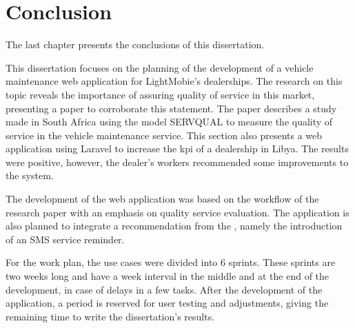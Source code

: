 \chapter{Conclusion}%
\label{chapter:conclusion}

\begin{introduction}
The last chapter presents the conclusions of this dissertation.
\end{introduction} 


This dissertation focuses on the planning of the development of a vehicle maintenance web application for LightMobie's dealerships. 
The research on this topic reveals the importance of assuring quality of service in this market, presenting a paper to corroborate this statement.
The paper describes a study made in South Africa using the model SERVQUAL to measure the quality of service in the vehicle maintenance service.
This section also presents a web application using Laravel to increase the \acs{kpi} of a dealership in Libya. 
The results were positive, however, the dealer's workers recommended some improvements to the system.

The development of the web application was based on the workflow of the research paper with an emphasis on quality service evaluation.
The application is also planned to integrate a recommendation from the \citet{MAS_MOTORS}, namely the introduction of an SMS service reminder. 

For the work plan, the use cases were divided into 6 sprints. 
These sprints are two weeks long and have a week interval in the middle and at the end of the development, in case of delays in a few tasks.
After the development of the application, a period is reserved for user testing and adjustments, giving the remaining time to write the dissertation's results.

